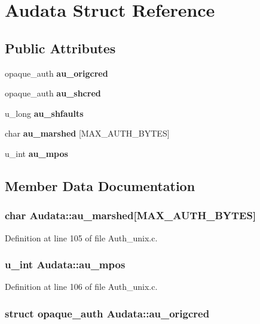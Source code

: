 \section{Audata Struct Reference}
\label{structAudata}
\subsection*{Public Attributes}
\begin{CompactItemize}
\item 
opaque\_\-auth {\bf au\_\-origcred}
\item 
opaque\_\-auth {\bf au\_\-shcred}
\item 
u\_\-long {\bf au\_\-shfaults}
\item 
char {\bf au\_\-marshed} [MAX\_\-AUTH\_\-BYTES]
\item 
u\_\-int {\bf au\_\-mpos}
\end{CompactItemize}


\subsection{Member Data Documentation}
\subsubsection{\setlength{\rightskip}{0pt plus 5cm}char {\bf Audata::au\_\-marshed}[MAX\_\-AUTH\_\-BYTES]}\label{structAudata_o3}




Definition at line 105 of file Auth\_\-unix.c.
\subsubsection{\setlength{\rightskip}{0pt plus 5cm}u\_\-int {\bf Audata::au\_\-mpos}}\label{structAudata_o4}




Definition at line 106 of file Auth\_\-unix.c.
\subsubsection{\setlength{\rightskip}{0pt plus 5cm}struct opaque\_\-auth {\bf Audata::au\_\-origcred}}\label{structAudata_o0}




